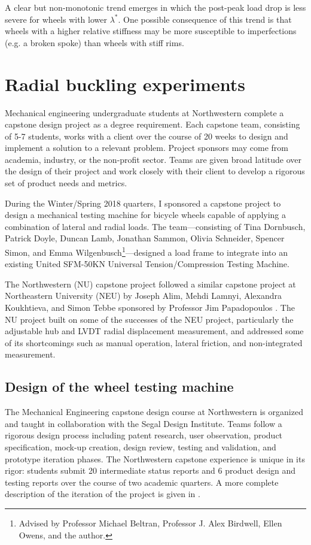 \documentclass[\rootdir/thesis.tex]{subfiles}
\begin{document}
A clear but non-monotonic trend emerges in which the post-peak load drop is less severe for wheels with lower $\lambda^*$. One possible consequence of this trend is that wheels with a higher relative stiffness may be more susceptible to imperfections (e.g. a broken spoke) than wheels with stiff rims.


\section{Radial buckling experiments}

Mechanical engineering undergraduate students at Northwestern complete a capstone design project as a degree requirement. Each capstone team, consisting of 5-7 students, works with a client over the course of 20 weeks to design and implement a solution to a relevant problem. Project sponsors may come from academia, industry, or the non-profit sector. Teams are given broad latitude over the design of their project and work closely with their client to develop a rigorous set of product needs and metrics.

During the Winter/Spring 2018 quarters, I sponsored a capstone project to design a mechanical testing machine for bicycle wheels capable of applying a combination of lateral and radial loads. The team---consisting of Tina Dornbusch, Patrick Doyle, Duncan Lamb, Jonathan Sammon, Olivia Schneider, Spencer Simon, and Emma Wilgenbusch\footnote{Advised by Professor Michael Beltran, Professor J. Alex Birdwell, Ellen Owens, and the author.}---designed a load frame to integrate into an existing United SFM-50KN Universal Tension/Compression Testing Machine.

The Northwestern (NU) capstone project followed a similar capstone project at Northeastern University (NEU) by Joseph Alim, Mehdi Lamnyi, Alexandra Koukhtieva, and Simon Tebbe sponsored by Professor Jim Papadopoulos \cite{Alim2016}. The NU project built on some of the successes of the NEU project, particularly the adjustable hub and LVDT radial displacement measurement, and addressed some of its shortcomings such as manual operation, lateral friction, and non-integrated measurement.

\subsection{Design of the wheel testing machine}

The Mechanical Engineering capstone design course at Northwestern is organized and taught in collaboration with the Segal Design Institute. Teams follow a rigorous design process including patent research, user observation, product specification, mock-up creation, design review, testing and validation, and prototype iteration phases. The Northwestern capstone experience is unique in its rigor: students submit 20 intermediate status reports and 6 product design and testing reports over the course of two academic quarters. A more complete description of the iteration of the project is given in \cite{WheelCats2018}.
\end{document}

